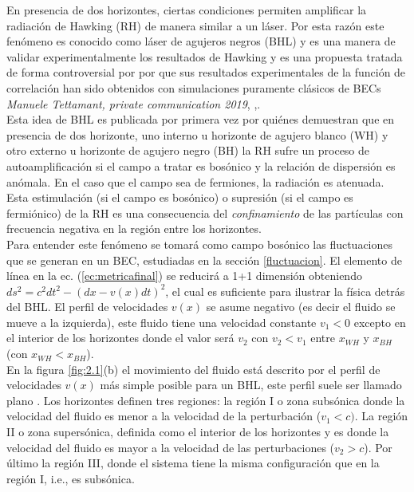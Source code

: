 En presencia de dos horizontes, ciertas condiciones permiten amplificar la radiaci\'{o}n de Hawking (RH) de manera similar a un l\'{a}ser. Por esta raz\'{o}n este fen\'{o}meno es conocido como l\'{a}ser de agujeros negros (BHL) y es una manera de validar experimentalmente los resultados de Hawking y es una propuesta tratada de forma controversial por \cite{Steinhauer2014} por que sus resultados experimentales de la funci\'{o}n de correlaci\'{o}n han sido obtenidos con simulaciones puramente cl\'{a}sicos de BECs \textit{Manuele Tettamant, private communication 2019}, \citep{tettamanti2016numerical},\citep{steinhauer2017self}.\\

Esta idea de BHL es publicada por primera vez por \citep{Corley1999} qui\'{e}nes demuestran que en presencia de dos horizonte, uno interno u horizonte de agujero blanco (WH) y otro externo u horizonte de agujero negro (BH) la RH sufre un proceso de autoamplificaci\'{o}n si el campo a tratar es bos\'{o}nico y la relaci\'{o}n de dispersi\'{o}n es an\'{o}mala. En el caso que el campo sea de fermiones, la radiaci\'{o}n es atenuada.\\ Esta estimulaci\'{o}n (si el campo es bos\'{o}nico) o supresi\'{o}n (si el campo es fermi\'{o}nico) de la RH es una consecuencia del \textit{confinamiento} de las part\'{i}culas con frecuencia negativa en la regi\'{o}n entre los horizontes.\\

Para entender este fen\'{o}meno  se tomar\'{a} como campo bos\'{o}nico las fluctuaciones que se generan en un BEC, estudiadas en la secci\'{o}n \ref{fluctuacion}. El elemento de l\'{i}nea en la ec. (\ref{ec:metricafinal}) se reducir\'{a} a 1+1 dimensi\'{o}n obteniendo $ds^2=c^2dt^2-(dx-v(x)dt)^2$, el cual es suficiente para ilustrar la f\'{i}sica detr\'{a}s del BHL. El perfil de velocidades $v(x)$ se asume negativo (es decir el fluido se mueve a la izquierda), este fluido tiene una velocidad constante  $v_1<0$ excepto en el interior de los horizontes donde el valor ser\'{a} $v_2$ con $v_2<v_1$ entre $x_{WH}$ y $x_{BH}$ (con $x_{WH}<x_{BH}$).\\

En la figura \ref{fig:2.1}(b) el movimiento del fluido est\'{a} descrito por el perfil de velocidades $v(x)$ m\'{a}s simple posible para un BHL, este perfil suele ser llamado plano \citep{2012Larre}. Los horizontes definen tres regiones: la regi\'{o}n I o zona subs\'{o}nica donde la velocidad del fluido es menor a la velocidad de la perturbaci\'{o}n ($v_1<c)$. La regi\'{o}n II o zona supers\'{o}nica, definida como el interior de los horizontes y es donde la velocidad del fluido es mayor a la velocidad de las perturbaciones ($v_2>c$). Por \'{u}ltimo la regi\'{o}n III, donde el sistema tiene la misma configuraci\'{o}n que en la regi\'{o}n I, i.e., es subs\'{o}nica.\\



